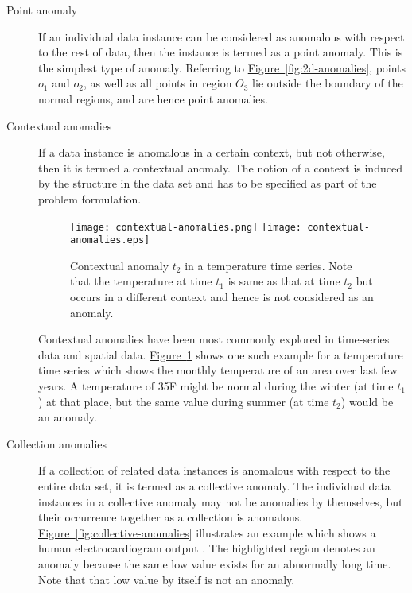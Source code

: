\begin{description}
\item[Point anomaly] If an individual data instance can be considered as 
anomalous with respect to the rest of data, then the instance is termed as a 
point anomaly. This is the simplest type of anomaly. Referring to 
\hyperref[fig:2d-anomlies]{Figure~\ref{fig:2d-anomalies}}, points $o_{1}$ and 
$o_{2}$, as well as all points in region $O_{3}$ lie outside the boundary of the
normal regions, and are hence point anomalies.

\item[Contextual anomalies] If a data instance is anomalous in a certain 
context, but not otherwise, then it is termed a contextual anomaly. The notion 
of a context is induced by the structure in the data set and has to be specified
as part of the problem formulation.

\begin{figure}
\centering
\ifpdf
	\texttt{[image: contextual-anomalies.png]}
\else
	\texttt{[image: contextual-anomalies.eps]}
\fi
\caption{Contextual anomaly $t_{2}$ in a temperature time series. Note that the 
temperature at time $t_{1}$ is same as that at time $t_{2}$ but occurs in a 
different context and hence is not considered as an anomaly.}
\label{fig:contextual-anomalies}
\end{figure}

Contextual anomalies have been most commonly explored in time-series data and 
spatial data. \hyperref[fig:contextual-anomalies]
{Figure~\ref{fig:contextual-anomalies}} shows one such example for a temperature
time series which shows the monthly temperature of an area over last few years. 
A temperature of 35F might be normal during the winter (at time $t_{1}$) at that
place, but the same value during summer (at time $t_{2}$) would be an anomaly.

\item[Collection anomalies] If a collection of related data instances is 
anomalous with respect to the entire data set, it is termed as a collective 
anomaly. The individual data instances in a collective anomaly may not be 
anomalies by themselves, but their occurrence together as a collection is 
anomalous. \hyperref[fig:collective-anomalies]
{Figure~\ref{fig:collective-anomalies}} illustrates an example which shows a 
human electrocardiogram output \cite{GOLDBERGER00}. The highlighted region 
denotes an anomaly because the same low value exists for an abnormally long 
time. Note that that low value by itself is not an anomaly.

\end{description}

